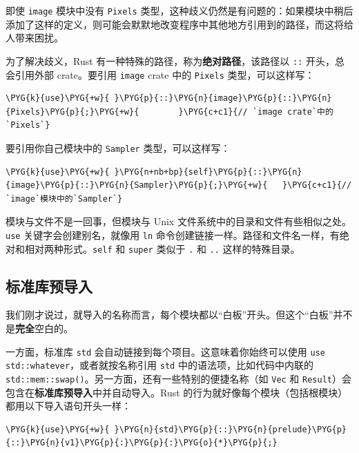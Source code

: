 即使 \texttt{image} 模块中没有 \texttt{Pixels} 类型，这种歧义仍然是有问题的：如果模块中稍后添加了这样的定义，则可能会默默地改变程序中其他地方引用到的路径，而这将给人带来困扰。

为了解决歧义，Rust 有一种特殊的路径，称为\textbf{绝对路径}，该路径以 \texttt{::} 开头，总会引用外部 crate。要引用 \texttt{image} crate 中的 \texttt{Pixels} 类型，可以这样写：

\begin{Verbatim}[commandchars=\\\{\},breaklines=true,breakanywhere=true,fontsize=\codefont,xleftmargin=17bp]
\PYG{k}{use}\PYG{+w}{ }\PYG{p}{::}\PYG{n}{image}\PYG{p}{::}\PYG{n}{Pixels}\PYG{p}{;}\PYG{+w}{        }\PYG{c+c1}{// `image crate`中的`Pixels`}
\end{Verbatim}

要引用你自己模块中的 \texttt{Sampler} 类型，可以这样写：

\begin{Verbatim}[commandchars=\\\{\},breaklines=true,breakanywhere=true,fontsize=\codefont,xleftmargin=17bp]
\PYG{k}{use}\PYG{+w}{ }\PYG{n+nb+bp}{self}\PYG{p}{::}\PYG{n}{image}\PYG{p}{::}\PYG{n}{Sampler}\PYG{p}{;}\PYG{+w}{   }\PYG{c+c1}{// `image`模块中的`Sampler`}
\end{Verbatim}

模块与文件不是一回事，但模块与 Unix 文件系统中的目录和文件有些相似之处。\texttt{use} 关键字会创建别名，就像用 \texttt{ln} 命令创建链接一样。路径和文件名一样，有绝对和相对两种形式。\texttt{self} 和 \texttt{super} 类似于 \texttt{.} 和 \texttt{..} 这样的特殊目录。

\subsection{标准库预导入}

我们刚才说过，就导入的名称而言，每个模块都以“白板”开头。但这个“白板”并不是\textbf{完全}空白的。

一方面，标准库 \texttt{std} 会自动链接到每个项目。这意味着你始终可以使用 \texttt{use std::whatever}，或者就按名称引用 \texttt{std} 中的语法项，比如代码中内联的 \texttt{std::mem::swap()}。另一方面，还有一些特别的便捷名称（如 \texttt{Vec} 和 \texttt{Result}）会包含在\textbf{标准库预导入}中并自动导入。Rust 的行为就好像每个模块（包括根模块）都用以下导入语句开头一样：

\begin{Verbatim}[commandchars=\\\{\},breaklines=true,breakanywhere=true,fontsize=\codefont,xleftmargin=17bp]
\PYG{k}{use}\PYG{+w}{ }\PYG{n}{std}\PYG{p}{::}\PYG{n}{prelude}\PYG{p}{::}\PYG{n}{v1}\PYG{p}{:}\PYG{p}{:}\PYG{o}{*}\PYG{p}{;}
\end{Verbatim}

